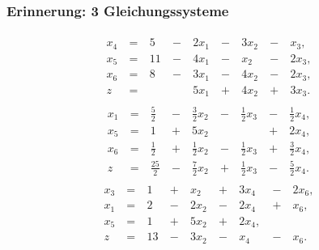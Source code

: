 \documentclass[smaller]{beamer}
\begin{document}
\begin{frame}
 \frametitle{Erinnerung: 3 Gleichungssysteme}
 \begin{align}
\begin{alignedat}{5}
\label{eq:2:3}
x_4 &\ = &\  5 &\ - &\ 2x_1 &\ - &\ 3x_2 &\ - &\  x_3,\ \\
x_5 &\ = &\ 11 &\ - &\ 4x_1 &\ - &\  x_2 &\ - &\ 2x_3,\ \\
x_6 &\ = &\  8 &\ - &\ 3x_1 &\ - &\ 4x_2 &\ - &\ 2x_3,\ \\
z   &\ = &     &    &\ 5x_1 &\ + &\ 4x_2 &\ + &\ 3x_3.\
\end{alignedat}
\end{align}
\begin{align}
\begin{alignedat}{5}
\label{eq:2:8}
x_1 &\ = &\  \tfrac{5}{2} &\ - &\ \tfrac{3}{2}x_2 &\ - &\ \tfrac{1}{2}x_3 &\ - &\ \tfrac{1}{2}x_4,\ \\
x_5 &\ = &\            1 &\ + &\           5x_2 &    &                 &\ + &\           2x_4,\ \\
x_6 &\ = &\  \tfrac{1}{2} &\ + &\ \tfrac{1}{2}x_2 &\ - &\ \tfrac{1}{2}x_3 &\ + &\ \tfrac{3}{2}x_4,\ \\
z   &\ = &\ \tfrac{25}{2} &\ - &\ \tfrac{7}{2}x_2 &\ + &\ \tfrac{1}{2}x_3 &\ - &\ \tfrac{5}{2}x_4.\
\end{alignedat}
\end{align}
\begin{align}
\begin{alignedat}{5}
\label{eq:2:10}
x_3 &\ = &\  1 &\ + &\  x_2 &\ + &\ 3x_4 &\ - &\ 2x_6,\ \\
x_1 &\ = &\  2 &\ - &\ 2x_2 &\ - &\ 2x_4 &\ + &\  x_6,\ \\
x_5 &\ = &\  1 &\ + &\ 5x_2 &\ + &\ 2x_4, &    &        \\
z   &\ = &\ 13 &\ - &\ 3x_2 &\ - &\  x_4 &\ - &\  x_6.\
\end{alignedat}
\end{align}
\end{frame}
\end{document}
